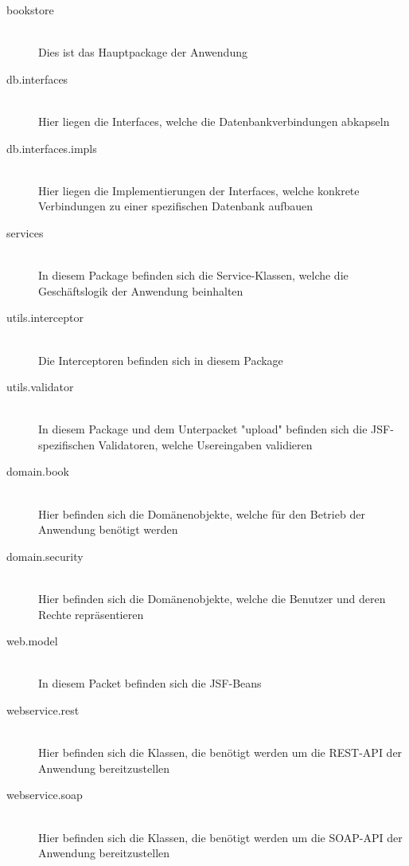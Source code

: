 \documentclass[12pt,a4paper]{book}
\begin{document}
		\begin{description}
			\item[bookstore] \hfill \\
			 Dies ist das Hauptpackage der Anwendung
			 	\item[db.interfaces] \hfill \\
				 	Hier liegen die Interfaces, welche die Datenbankverbindungen abkapseln
			 		\item[db.interfaces.impls] \hfill \\
			 		Hier liegen die Implementierungen der Interfaces, welche konkrete Verbindungen zu einer spezifischen Datenbank aufbauen
			 	\item[services] \hfill \\
			 	In diesem Package befinden sich die Service-Klassen, welche die Geschäftslogik der Anwendung beinhalten
		\item[utils.interceptor] \hfill \\
		Die Interceptoren befinden sich in diesem Package
		\item[utils.validator] \hfill \\
		In diesem Package und dem Unterpacket "upload" befinden sich die JSF-spezifischen Validatoren, welche Usereingaben validieren
		\item[domain.book] \hfill \\
		Hier befinden sich die Domänenobjekte, welche für den Betrieb der Anwendung benötigt werden 
		\item[domain.security] \hfill \\
		Hier befinden sich die Domänenobjekte, welche die Benutzer und deren Rechte repräsentieren
		\item[web.model] \hfill \\
		In diesem Packet befinden sich die JSF-Beans
		\item[webservice.rest] \hfill \\
		Hier befinden sich die Klassen, die benötigt werden um die REST-API der Anwendung bereitzustellen
		\item[webservice.soap] \hfill \\
		Hier befinden sich die Klassen, die benötigt werden um die SOAP-API der Anwendung bereitzustellen
		\end{description}
		
		
\end{document}
